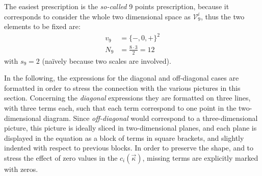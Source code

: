 The easiest prescription is the \textit{so-called} 9 points prescription,
because it corresponds to consider the whole two dimensional space as
$\mathcal{V}_9^i$, thus the two elements to be fixed are:
\begin{align}
    \label{eq:mhou/prescr/9specs}
    v_9 &= \{-, 0, +\}^2\\
    N_9 &= \frac{8 \cdot 3}{2} = 12
\end{align}
with $s_9 = 2$ (na\"ively because two scales are involved).

In the following, the expressions for the diagonal and off-diagonal cases are
formatted in order to stress the connection with the various pictures in this
section.
Concerning the \textit{diagonal} expressions they are formatted on three lines,
with three terms each, such that each term correspond to one point in the
two-dimensional diagram.
Since \textit{off-diagonal} would correspond to a three-dimensional picture,
this picture is ideally sliced in two-dimensional planes, and each plane is
displayed in the equation as a block of terms in square brackets, and slightly
indented with respect to previous blocks.
In order to preserve the shape, and to stress the effect of zero values in the
$c_i(\vec{\kappa})$, missing terms are explicitly marked with zeros.

